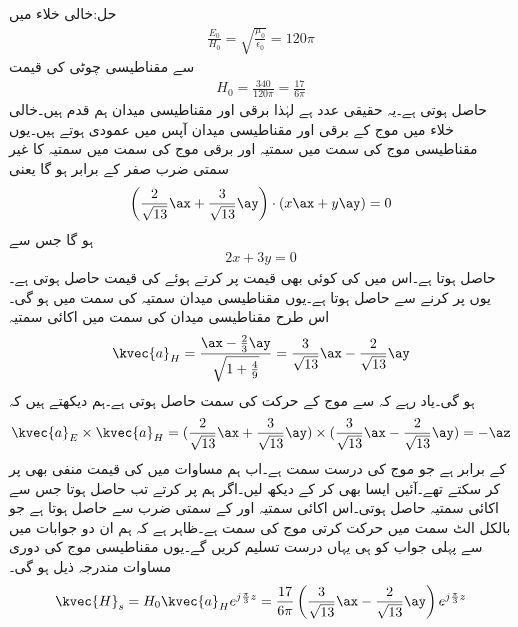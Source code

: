 حل:خالی خلاء میں
\begin{align*}
\frac{E_0}{H_0}=\sqrt{\frac{\mu_0}{\epsilon_0}} =120\pi
\end{align*} 
سے مقناطیسی چوٹی کی قیمت 
\begin{align*}
H_0=\frac{340}{120\pi}=\frac{17}{6\pi}
\end{align*}
حاصل ہوتی ہے۔یہ حقیقی عدد ہے لہٰذا برقی اور مقناطیسی میدان ہم قدم ہیں۔خالی خلاء میں موج کے برقی اور مقناطیسی میدان آپس میں عمودی ہوتے ہیں۔یوں مقناطیسی موج کی سمت میں سمتیہ  اور  برقی موج کی سمت میں سمتیہ  کا غیر سمتی ضرب صفر کے برابر ہو گا یعنی
\begin{align*}
\left(\frac{2}{\sqrt{13}}\ax+\frac{3}{\sqrt{13}}\ay\right) \cdot (x \ax+y \ay)=0
\end{align*}
ہو گا جس سے
\begin{align}\label{مساوات_مستوی_موج_برقی_مقناطیسی_عمودی_اکائی}
2x+3y=0
\end{align}
حاصل ہوتا ہے۔اس میں  کی کوئی بھی قیمت پر کرتے ہوئے  کی قیمت حاصل ہوتی ہے۔یوں  پر کرنے سے  حاصل ہوتا ہے۔یوں مقناطیسی میدان   سمتیہ کی سمت میں ہو گی۔ اس طرح مقناطیسی میدان کی سمت میں اکائی سمتیہ
\begin{align*}
\kvec{a}_H=\frac{\ax-\frac{2}{3}\ay}{\sqrt{1+\frac{4}{9}}}=\frac{3}{\sqrt{13}}\ax-\frac{2}{\sqrt{13}}\ay
\end{align*}
ہو گی۔یاد رہے کہ  سے موج کے حرکت کی سمت حاصل ہوتی ہے۔ہم دیکھتے ہیں کہ
\begin{align*}
\kvec{a}_E \times \kvec{a}_H=(\frac{2}{\sqrt{13}}\ax+\frac{3}{\sqrt{13}}\ay) \times (\frac{3}{\sqrt{13}}\ax-\frac{2}{\sqrt{13}}\ay)=-\az
\end{align*}
کے برابر ہے جو موج کی درست سمت ہے۔اب ہم مساوات  میں  کی قیمت منفی بھی پر کر سکتے تھے۔آئیں ایسا بھی کر کے دیکھ لیں۔اگر ہم  پر کرتے تب  حاصل ہوتا جس سے اکائی سمتیہ   حاصل ہوتی۔اس اکائی سمتیہ اور  کے سمتی ضرب سے  حاصل ہوتا ہے جو بالکل الٹ سمت میں حرکت کرتی موج کی سمت ہے۔ظاہر ہے کہ ہم ان دو جوابات میں سے پہلی جواب کو ہی یہاں درست تسلیم کریں گے۔یوں مقناطیسی موج کی دوری مساوات مندرجہ ذیل ہو گی۔
\begin{align*}
\kvec{H}_s=H_0 \kvec{a}_H e^{j\frac{\pi}{3} z}=\frac{17}{6\pi} \left(\frac{3}{\sqrt{13}}\ax-\frac{2}{\sqrt{13}}\ay \right)e^{j\frac{\pi}{3} z}
\end{align*}
 
